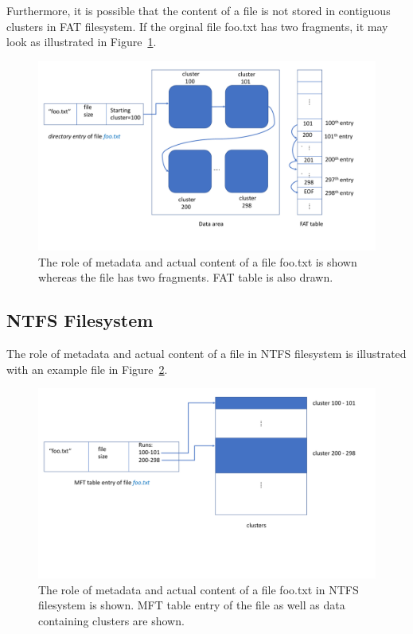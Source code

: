 Furthermore, it is possible that the content of a file is not stored in contiguous clusters in FAT filesystem. 
If the orginal file foo.txt has two fragments, it may look as illustrated in Figure~\ref{fig:fat3}.

\begin{figure}[h]
    \centering
    \includegraphics[width=\linewidth]{fig/fat3.pdf}
    \caption{The role of metadata and actual content of a file foo.txt is shown whereas the file has two fragments. FAT table is also drawn.}
    \label{fig:fat3}
\end{figure}
\subsection{NTFS Filesystem}

The role of metadata and actual content of a file in NTFS filesystem is illustrated with an example file in Figure~\ref{fig:ntfs}.

\begin{figure}[h]
    \centering
    \includegraphics[width=\linewidth]{fig/ntfs.pdf}
    \caption{The role of metadata and actual content of a file foo.txt in NTFS filesystem is shown. MFT table entry of the file as well as data containing clusters are shown.}
    \label{fig:ntfs}
\end{figure}
